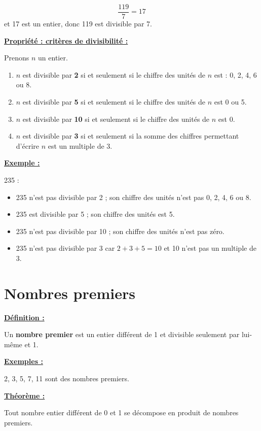 \documentclass[13pt]{extarticle}
\newcommand{\blocTitre}[1]{%
  \vspace{1em}%
  \noindent\underline{\textbf{#1 :}}\par%
  \vspace{0.3em}%
}
\begin{document}
\[
\frac{119}{7} = 17
\]
et 17 est un entier, donc 119 est divisible par 7.


\blocTitre{Propriété : critères de divisibilité}

Prenons $n$ un entier.

\begin{enumerate}
  \item $n$ est divisible par \textbf{2} si et seulement si le chiffre des unités de $n$ est : 0, 2, 4, 6 ou 8.
  \item $n$ est divisible par \textbf{5} si et seulement si le chiffre des unités de $n$ est 0 ou 5.
  \item $n$ est divisible par \textbf{10} si et seulement si le chiffre des unités de $n$ est 0.
  \item $n$ est divisible par \textbf{3} si et seulement si la somme des chiffres permettant d'écrire $n$ est un multiple de 3.
\end{enumerate}

\blocTitre{Exemple}

235 :
\begin{itemize}
  \item 235 n'est pas divisible par 2 ; son chiffre des unités n'est pas 0, 2, 4, 6 ou 8.
  \item 235 est divisible par 5 ; son chiffre des unités est 5.
  \item 235 n'est pas divisible par 10 ; son chiffre des unités n'est pas zéro.
  \item 235 n'est pas divisible par 3 car $2 + 3 + 5 = 10$ et 10 n'est pas un multiple de 3.
\end{itemize}

\section{Nombres premiers}

\blocTitre{Définition}

Un \textbf{nombre premier} est un entier différent de 1 et divisible seulement par lui-même et 1.

\blocTitre{Exemples}

2, 3, 5, 7, 11 sont des nombres premiers.


\blocTitre{Théorème}

Tout nombre entier différent de 0 et 1 se décompose en produit de nombres premiers.
\end{document}
